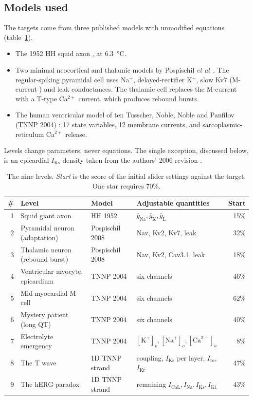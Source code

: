 \documentclass[11pt,a4paper]{article}
\newcommand{\IKr}{I_{\mathrm{Kr}}}
\newcommand{\IKs}{I_{\mathrm{Ks}}}
\newcommand{\ICaL}{I_{\mathrm{CaL}}}
\newcommand{\INa}{I_{\mathrm{Na}}}
\newcommand{\etal}{\textit{et al}}
\begin{document}
\subsection{Models used}
The targets come from three published models with unmodified equations (table~\ref{tab:levels}).
\begin{itemize}
\item The 1952 HH squid axon \cite{HH1952}, at \SI{6.3}{\celsius}.
\item Two minimal neocortical and thalamic models by Pospischil \etal\ \cite{Pospischil2008}. The regular-spiking pyramidal cell uses Na$^+$, delayed-rectifier K$^+$, slow Kv7 (M-current \cite{BrownAdams1980}) and leak conductances. The thalamic cell replaces the M-current with a T-type Ca$^{2+}$ current, which produces rebound bursts.
\item The human ventricular model of ten Tusscher, Noble, Noble and Panfilov (TNNP 2004) \cite{TNNP2004}: 17 state variables, 12 membrane currents, and sarcoplasmic-reticulum Ca$^{2+}$ release.
\end{itemize}
Levels change parameters, never equations. The single exception, discussed below, is an epicardial $\IKs$ density taken from the authors' 2006 revision \cite{TP2006}.

\begin{table}[t]
\centering\small
\caption{The nine levels. \emph{Start} is the score of the initial slider settings against the target. One star requires 70\%.}
\label{tab:levels}
\begin{tabular}{@{}rlllr@{}}
\toprule
\# & Level & Model & Adjustable quantities & Start \\
\midrule
1 & Squid giant axon & HH 1952 & $\bar g_{\mathrm{Na}}, \bar g_{\mathrm{K}}, \bar g_{\mathrm{L}}$ & 15\% \\
2 & Pyramidal neuron (adaptation) & Pospischil 2008 & Nav, Kv2, Kv7, leak & 32\% \\
3 & Thalamic neuron (rebound burst) & Pospischil 2008 & Nav, Kv2, Cav3.1, leak & 18\% \\
4 & Ventricular myocyte, epicardium & TNNP 2004 & six channels & 46\% \\
5 & Mid-myocardial M cell & TNNP 2004 & six channels & 62\% \\
6 & Mystery patient (long QT) & TNNP 2004 & six channels & 40\% \\
7 & Electrolyte emergency & TNNP 2004 & $[\mathrm{K}^+]_o, [\mathrm{Na}^+]_o, [\mathrm{Ca}^{2+}]_o$ & 8\% \\
8 & The T wave & 1D TNNP strand & coupling, $\IKs$ per layer, $I_{\mathrm{to}}$, $\IKr$ & 47\% \\
9 & The hERG paradox & 1D TNNP strand & remaining $\ICaL, \INa, \IKs, I_{\mathrm{K1}}$ & 43\% \\
\bottomrule
\end{tabular}
\end{table}
\end{document}
